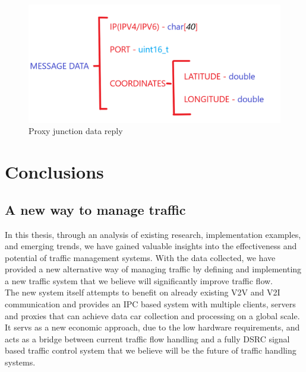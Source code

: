 \documentclass[17pt]{report}
\begin{document}
\begin{figure}[h!]
    \includegraphics[width=\textwidth]{Sketches/ProxyJunctionMessage.png}
    \caption{Proxy junction data reply}
    \label{fig:Proxy junction data reply}
\end{figure}


\chapter{Conclusions}
\section{A new way to manage traffic}
\indent \indent
In this thesis, through an analysis of existing research,
implementation examples, and emerging trends, we have gained valuable
insights into the effectiveness and potential of traffic management
systems. With the data collected, we have provided a new alternative 
way of managing traffic by defining and implementing a new traffic 
system that we believe will significantly improve traffic flow. \\
\indent
The new system itself attempts to benefit on already existing V2V and V2I
communication and provides an IPC based system with multiple clients, servers
and proxies that can achieve data car collection and processing on a global scale.
It servs as a new economic approach, due to the low hardware requirements,
and acts as a bridge between current traffic flow handling and a fully 
DSRC signal based traffic control system that we believe will be the 
future of traffic handling systems.
\end{document}
